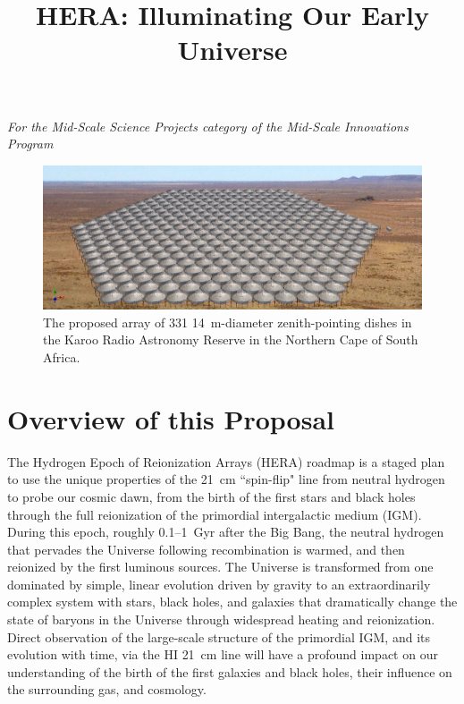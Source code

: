 \documentclass[preprint]{aastex}
\newcommand{\compress}{\vspace{-0.25in}}
\newcommand{\Caption}[4]{\vspace{#1}\renewcommand{\baselinestretch}{#2}\caption{#4}\vspace{#3}}
\def\HI{{H{\small I }}}
\begin{document}
\title{HERA: Illuminating Our Early Universe}
{\it For the Mid-Scale Science Projects category of the Mid-Scale
Innovations Program}

\begin{figure}[H]\centering
\includegraphics[width=6in]{plots/hera331perspect2.jpg}
\Caption{-0.1in}{0.99}{-0.1in}{\small
The proposed array of 331 14~m-diameter zenith-pointing dishes in the Karoo Radio Astronomy Reserve
in the Northern Cape of South Africa.}\label{fig:hera_array} \end{figure}


\compress
\section{Overview of this Proposal} %


The Hydrogen Epoch of Reionization Arrays (HERA) roadmap is a staged
plan to use the unique properties of the 21~cm ``spin-flip" line from neutral
hydrogen to probe our cosmic dawn, from the birth of the first 
stars and black holes through the full reionization of the primordial
intergalactic medium (IGM). During this epoch, roughly 0.1--1~Gyr after the Big Bang, 
the neutral hydrogen that pervades the Universe 
following recombination is warmed, and then reionized by the first luminous sources. 
The Universe is transformed from one dominated by simple,
linear evolution driven by gravity to an extraordinarily complex system with stars, black holes, and galaxies that
dramatically change the state of baryons in the Universe through widespread heating and reionization.
Direct observation of the large-scale structure of the primordial
IGM, and its evolution with time, via the \HI 21~cm line will
have a profound impact on our understanding of the birth of the first
galaxies and black holes, their influence on the surrounding gas,
and cosmology. 
\end{document}
